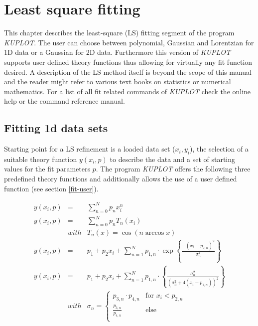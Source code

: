 
\chapter{Least square fitting \label {fit}}

This chapter describes the least-square (LS) fitting segment of the
program {\it KUPLOT}. The user can choose between polynomial, Gaussian
and Lorentzian for 1D data or a Gaussian for 2D data. Furthermore
this version of {\it KUPLOT} supports user defined theory functions
thus allowing for virtually any fit function desired. A description
of the LS method itself is beyond the scope of this manual and the
reader might refer to various text books on statistics or numerical
mathematics. For a list of all fit related commands of {\it KUPLOT}
check the online help or the command reference manual.


\section{Fitting 1d data sets \label{fit-1d}}

Starting point for a LS refinement is a loaded data set ($x_{i}, y_{i}$),
the selection of a suitable theory function $y(x_{i},p)$ to describe
the data and a set of starting values for the fit parameters $p$.
The program {\it KUPLOT} offers the following three predefined theory
functions and additionally allows the use of a user defined function
(see section \ref{fit-user}).

\begin{eqnarray}
    y(x_{i},p) & = & \sum_{n=0}^{N} p_{n} x_{i}^{n}
    \label{fit-1d-eq1}  \\
    y(x_{i},p) & = & \sum_{n=0}^{N} p_{n} T_{n}(x_{i}) \\
               & with & T_{n}(x)=\cos(n \arccos x)
    \label{fit-1d-eq1b}\nonumber \\
    y(x_{i},p) & = & p_{1} + p_{2}x_{i} +
                     \sum_{n=1}^{N} p_{1,n}\cdot\exp\left\{
                     \frac {-(x_{i}-p_{2,n})^{2}}{\sigma_{n}^{2}}\right\}
    \label{fit-1d-eq2}  \\
    y(x_{i},p) & = & p_{1} + p_{2}x_{i} +
                     \sum_{n=1}^{N} p_{1,n}\cdot\left\{\frac{\sigma_{n}^{2}}
                     {(\sigma_{n}^{2}+4(x_{i}-p_{1,n}))^{2}}\right\}
    \label{fit-1d-eq3} \\
    & with & \sigma_{n} = \left\{ \begin{array}{ll}
                 p_{3,n} \cdot p_{4,n} & \mbox {for $x_{i} < p_{2,n}$}\\
                 \frac{p_{3,n}}{p_{4,n}} & \mbox {else} \\ \end{array}
                 \right.
    \nonumber
\end{eqnarray}

